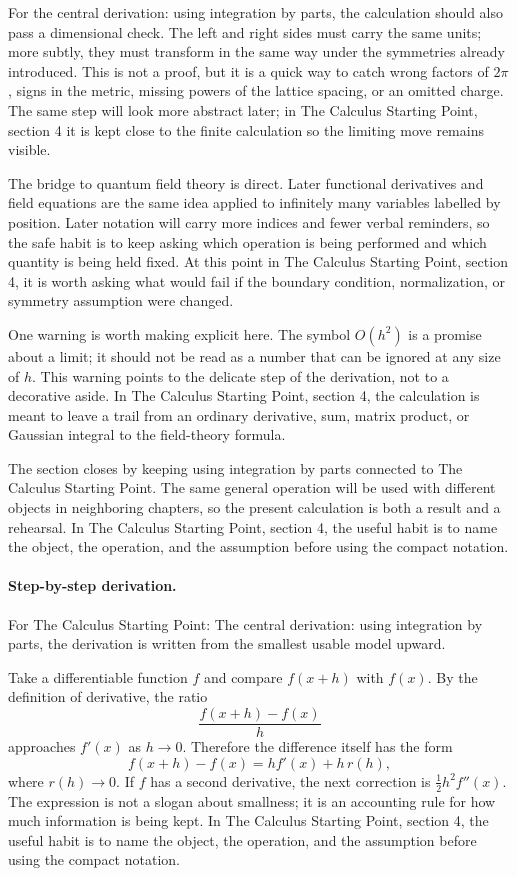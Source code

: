 For the central derivation: using integration by parts, the calculation should also pass a dimensional check.  The left and right sides must carry the same units; more subtly, they must transform in the same way under the symmetries already introduced.  This is not a proof, but it is a quick way to catch wrong factors of \(2\pi\), signs in the metric, missing powers of the lattice spacing, or an omitted charge.  The same step will look more abstract later; in The Calculus Starting Point, section 4 it is kept close to the finite calculation so the limiting move remains visible.

The bridge to quantum field theory is direct.  Later functional derivatives and field equations are the same idea applied to infinitely many variables labelled by position.  Later notation will carry more indices and fewer verbal reminders, so the safe habit is to keep asking which operation is being performed and which quantity is being held fixed.  At this point in The Calculus Starting Point, section 4, it is worth asking what would fail if the boundary condition, normalization, or symmetry assumption were changed.

One warning is worth making explicit here.  The symbol \(O(h^2)\) is a promise about a limit; it should not be read as a number that can be ignored at any size of \(h\).  This warning points to the delicate step of the derivation, not to a decorative aside.  In The Calculus Starting Point, section 4, the calculation is meant to leave a trail from an ordinary derivative, sum, matrix product, or Gaussian integral to the field-theory formula.

The section closes by keeping using integration by parts connected to The Calculus Starting Point.  The same general operation will be used with different objects in neighboring chapters, so the present calculation is both a result and a rehearsal.  In The Calculus Starting Point, section 4, the useful habit is to name the object, the operation, and the assumption before using the compact notation.



\paragraph{Step-by-step derivation.}

For The Calculus Starting Point: The central derivation: using integration by parts, the derivation is written from the smallest usable model upward.

Take a differentiable function \(f\) and compare \(f(x+h)\) with \(f(x)\).  By the definition of derivative, the ratio
\[
  \frac{f(x+h)-f(x)}{h}
\]
approaches \(f'(x)\) as \(h\to0\).  Therefore the difference itself has the form
\[
  f(x+h)-f(x)=hf'(x)+h\,r(h),
\]
where \(r(h)\to0\).  If \(f\) has a second derivative, the next correction is \(\frac12h^2f''(x)\).  The expression is not a slogan about smallness; it is an accounting rule for how much information is being kept.  In The Calculus Starting Point, section 4, the useful habit is to name the object, the operation, and the assumption before using the compact notation.

